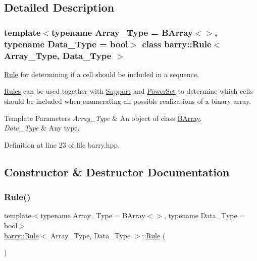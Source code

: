 \subsection{Detailed Description}
\subsubsection*{template$<$typename Array\+\_\+\+Type = B\+Array$<$$>$, typename Data\+\_\+\+Type = bool$>$\newline
class barry\+::\+Rule$<$ Array\+\_\+\+Type, Data\+\_\+\+Type $>$}

\hyperlink{classbarry_1_1_rule}{Rule} for determining if a cell should be included in a sequence. 

\hyperlink{classbarry_1_1_rules}{Rules} can be used together with {\ttfamily \hyperlink{classbarry_1_1_support}{Support}} and {\ttfamily \hyperlink{classbarry_1_1_power_set}{Power\+Set}} to determine which cells should be included when enumerating all possible realizations of a binary array. 
\begin{DoxyTemplParams}{Template Parameters}
{\em Array\+\_\+\+Type} & An object of class {\ttfamily \hyperlink{classbarry_1_1_b_array}{B\+Array}}. \\
\hline
{\em Data\+\_\+\+Type} & Any type. \\
\hline
\end{DoxyTemplParams}


Definition at line 23 of file barry.\+hpp.



\subsection{Constructor \& Destructor Documentation}
\mbox{\label{classbarry_1_1_rule_aa9d79df22874f000c8f4dd46b58cc157}} 
\subsubsection{\texorpdfstring{Rule()}{Rule()}\hspace{0.1cm}{\footnotesize\ttfamily [1/2]}}
{\footnotesize\ttfamily template$<$typename Array\+\_\+\+Type  = B\+Array$<$$>$, typename Data\+\_\+\+Type  = bool$>$ \\
\hyperlink{classbarry_1_1_rule}{barry\+::\+Rule}$<$ Array\+\_\+\+Type, Data\+\_\+\+Type $>$\+::\hyperlink{classbarry_1_1_rule}{Rule} (\begin{DoxyParamCaption}{ }\end{DoxyParamCaption})\hspace{0.3cm}{\ttfamily [inline]}}



